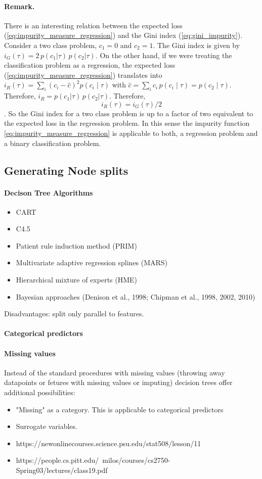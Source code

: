 \documentclass[12pt,a4paper]{article}
\begin{document}
\paragraph{Remark.} There is an interesting relation between the expected loss (\ref{eq:impurity_measure_regression}) and the Gini index (\ref{eq:gini_impurity}). Consider a two class problem, $c_1=0$ and $c_2=1$. The Gini index is given by $i_G(\tau) = 2\, p(c_1|\tau)\, p(c_2|\tau)$. On the other hand, if we were treating the classification problem as a regression, the expected loss (\ref{eq:impurity_measure_regression}) translates into $i_R(\tau) = \sum_i (c_i -\hat c)^2 p(c_i\mid \tau)$ with $\hat c = \sum_i c_i\,p(c_i \mid \tau) = p(c_2\mid \tau)$. Therefore, $i_R =  p(c_1|\tau)\, p(c_2|\tau)$. Therefore, 
$$i_R(\tau) = i_G(\tau) / 2$$. So the Gini index for a two class problem is up to a factor of two equivalent to the expected loss in the regression problem.  In this sense the impurity function \ref{eq:impurity_measure_regression} is applicable to both, a regression problem and a binary classification problem. 

\subsection{Generating Node splits}
\paragraph{Decison Tree Algorithms}
\begin{itemize}\itemsep0em 
	\item CART
	\item C4.5
	\item Patient rule induction method (PRIM)
	\item Multivariate adaptive regression splines (MARS)
	\item Hierarchical mixture of experts (HME)
	\item Bayesian approaches (Denison et al., 1998; Chipman et al., 1998, 2002, 2010)
\end{itemize}
Disadvantages: split only parallel to features.
\paragraph{Categorical predictors}
\paragraph{Missing values}
Instead of the standard procedures with missing values (throwing away datapoints or fetures with missing values or imputing) decision trees offer additional possibilities:
\begin{itemize}
	\item "Missing" as a category. This is applicable to categorical predictors
	\item Surrogate variables.
	\item https://newonlinecourses.science.psu.edu/stat508/lesson/11
	\item https://people.cs.pitt.edu/~milos/courses/cs2750-Spring03/lectures/class19.pdf
	
\end{itemize}
\end{document}
